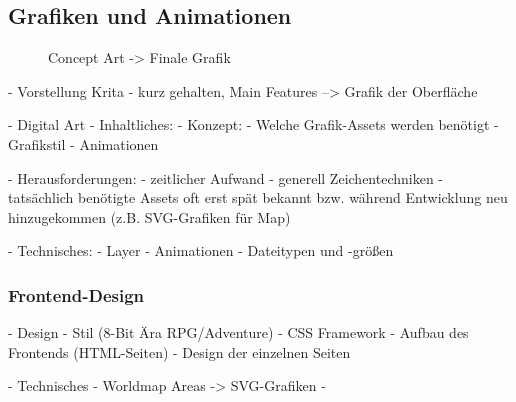 

\subsection{Grafiken und Animationen}

\begin{figure}[H]
    \centering
    \label{fig:mine_exterior_concept}
    \caption{Concept Art -> Finale Grafik}
\end{figure}

- Vorstellung Krita
    - kurz gehalten, Main Features --> Grafik der Oberfläche

- Digital Art
    - Inhaltliches:
        - Konzept:
            - Welche Grafik-Assets werden benötigt
            - Grafikstil
            - Animationen
        
        - Herausforderungen: 
            - zeitlicher Aufwand 
            - generell Zeichentechniken
            - tatsächlich benötigte Assets oft erst spät bekannt bzw. während Entwicklung neu hinzugekommen (z.B. SVG-Grafiken für Map)
    
    - Technisches:
        - Layer
        - Animationen
        - Dateitypen und -größen


\subsubsection{Frontend-Design}
    - Design
        - Stil (8-Bit Ära RPG/Adventure)
        - CSS Framework
        - Aufbau des Frontends (HTML-Seiten)
        - Design der einzelnen Seiten 

    - Technisches
        - Worldmap Areas -> SVG-Grafiken
        - 